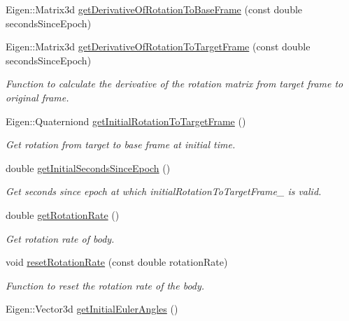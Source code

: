 \begin{DoxyCompactItemize}
Eigen\+::\+Matrix3d \hyperlink{classtudat_1_1ephemerides_1_1SimpleRotationalEphemeris_a8a73dcb9267d9fed8d187e3a6da0587b}{get\+Derivative\+Of\+Rotation\+To\+Base\+Frame} (const double seconds\+Since\+Epoch)
\item 
Eigen\+::\+Matrix3d \hyperlink{classtudat_1_1ephemerides_1_1SimpleRotationalEphemeris_a0195bb027ba27691e2eb7306dd8312fa}{get\+Derivative\+Of\+Rotation\+To\+Target\+Frame} (const double seconds\+Since\+Epoch)
\begin{DoxyCompactList}\small\item\em Function to calculate the derivative of the rotation matrix from target frame to original frame. \end{DoxyCompactList}\item 
Eigen\+::\+Quaterniond \hyperlink{classtudat_1_1ephemerides_1_1SimpleRotationalEphemeris_a8f9da325e1938ce694c587dd0926d5eb}{get\+Initial\+Rotation\+To\+Target\+Frame} ()
\begin{DoxyCompactList}\small\item\em Get rotation from target to base frame at initial time. \end{DoxyCompactList}\item 
double \hyperlink{classtudat_1_1ephemerides_1_1SimpleRotationalEphemeris_a990308031a62d986cc233b841a4f40bb}{get\+Initial\+Seconds\+Since\+Epoch} ()
\begin{DoxyCompactList}\small\item\em Get seconds since epoch at which initial\+Rotation\+To\+Target\+Frame\+\_\+ is valid. \end{DoxyCompactList}\item 
double \hyperlink{classtudat_1_1ephemerides_1_1SimpleRotationalEphemeris_aca6eb183bba5c7b0d88f2eebc3370b5b}{get\+Rotation\+Rate} ()
\begin{DoxyCompactList}\small\item\em Get rotation rate of body. \end{DoxyCompactList}\item 
void \hyperlink{classtudat_1_1ephemerides_1_1SimpleRotationalEphemeris_ad661bb96abc4ca8ba8c9559a1303cd07}{reset\+Rotation\+Rate} (const double rotation\+Rate)
\begin{DoxyCompactList}\small\item\em Function to reset the rotation rate of the body. \end{DoxyCompactList}\item 
Eigen\+::\+Vector3d \hyperlink{classtudat_1_1ephemerides_1_1SimpleRotationalEphemeris_a63943e2e3e47d91b671deebf8594aab9}{get\+Initial\+Euler\+Angles} ()

\end{DoxyCompactItemize}
